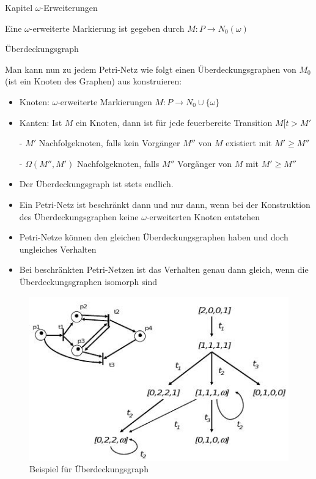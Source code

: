 \begin{chapter}{Kapitel}
\f{$\omega$-Erweiterungen}
\vspace*{4pt}

\noindent Eine $\omega$-erweiterte Markierung ist gegeben durch $M:P \rightarrow N_0(\omega)$
\vspace*{6pt}

\f{Überdeckungsgraph}
\vspace*{4pt}

\noindent Man kann nun zu jedem Petri-Netz wie folgt einen Überdeckungsgraphen von $M_0$ (ist ein Knoten des Graphen) aus konstruieren:
\begin{itemize}
 \item Knoten: $\omega$-erweiterte Markierungen $M:P\rightarrow N_0 \cup \{\omega \}$
 \item Kanten: Ist $M$ ein Knoten, dann ist für jede feuerbereite Transition $M[t>M'$ 
 
 \qquad \qquad  - $M'$ Nachfolgeknoten, falls kein Vorgänger $M''$ von $M$ existiert mit $M'\geq M''$
 
 \qquad \qquad  - $\Omega(M'',M')$ Nachfolgeknoten, falls $M''$ Vorgänger von $M$ mit $M'\geq M''$
\end{itemize}
\begin{itemize}
 \item Der Überdeckungsgraph ist stets endlich.
 \item Ein Petri-Netz ist beschränkt dann und nur dann, wenn bei der Konstruktion des Überdeckungsgraphen keine $\omega$-erweiterten Knoten entstehen
 \item Petri-Netze können den gleichen Überdeckungsgraphen haben und doch ungleiches Verhalten
 \item Bei beschränkten Petri-Netzen ist das Verhalten genau dann gleich, wenn die Überdeckungsgraphen isomorph sind
\end{itemize}

\begin{figure}[!ht]
 \centering
 \includegraphics[scale=0.85]{pics/ueberdeckungsgraph}
 \caption{Beispiel für Überdeckungsgraph}
\end{figure}


\end{chapter}
